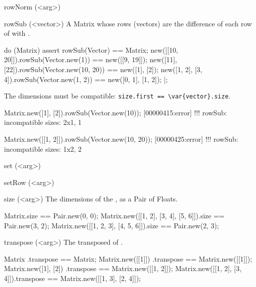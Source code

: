 \begin{urbiscriptapi}
\item[rowNorm](<arg>)%
\begin{urbiassert}

\end{urbiassert}

\item[rowSub](<vector>)%
  A Matrix whose rows (vectors) are the difference of each row of \this with
  .
\begin{urbiscript}
do (Matrix)
{
  assert
  {
    rowSub(Vector) == Matrix;
    new([[10, 20]]).rowSub(Vector.new(1))     == new([[9, 19]]);
    new([11], [22]).rowSub(Vector.new(10, 20)) == new([1], [2]);
    new([1, 2], [3, 4]).rowSub(Vector.new(1, 2)) == new([0, 1], [1, 2]);
  }
}|;
\end{urbiscript}

  The dimensions must be compatible:
  \lstinline|size.first == \var{vector}.size|.
\begin{urbiscript}
Matrix.new([1], [2]).rowSub(Vector.new(10));
[00000415:error] !!! rowSub: incompatible sizes: 2x1, 1

Matrix.new([[1, 2]]).rowSub(Vector.new(10, 20));
[00000425:error] !!! rowSub: incompatible sizes: 1x2, 2
\end{urbiscript}


\item[set](<arg>)%
\begin{urbiassert}

\end{urbiassert}

\item[setRow](<arg>)%
\begin{urbiassert}

\end{urbiassert}

\item[size](<arg>)%
  The dimensions of the \this, as a Pair of Floats.
\begin{urbiassert}
Matrix.size == Pair.new(0, 0);
Matrix.new([[1, 2], [3, 4], [5, 6]]).size == Pair.new(3, 2);
Matrix.new([[1, 2, 3], [4, 5, 6]]).size == Pair.new(2, 3);
\end{urbiassert}

\item[transpose](<arg>)%
  The transposed of \this.
\begin{urbiassert}
Matrix                      .transpose == Matrix;
Matrix.new([[1]])           .transpose == Matrix.new([[1]]);
Matrix.new([1], [2])        .transpose == Matrix.new([[1, 2]]);
Matrix.new([[1, 2], [3, 4]]).transpose == Matrix.new([[1, 3], [2, 4]]);
\end{urbiassert}


\end{urbiscriptapi}
